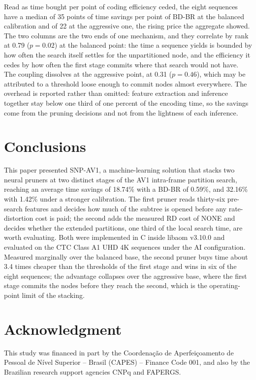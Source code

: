 \documentclass[conference]{IEEEtran}
\begin{document}
Read as time bought per point of coding efficiency ceded, the eight sequences
have a median of 35 points of time savings per point of BD-BR at the balanced
calibration and of 22 at the aggressive one, the rising price the aggregate
showed. The two columns are the two ends of one mechanism, and they correlate by
rank at 0.79 ($p = 0.02$) at the balanced point: the time a sequence yields is
bounded by how often the search itself settles for the unpartitioned node, and
the efficiency it cedes by how often the first stage commits where that search
would not have. The coupling dissolves at the aggressive point, at 0.31
($p = 0.46$), which may be attributed to a threshold loose enough to commit nodes
almost everywhere. The overhead is reported rather than omitted: feature
extraction and inference together stay below one third of one percent of the
encoding time, so the savings come from the pruning decisions and not from the
lightness of each inference.

\section{Conclusions}

This paper presented SNP-AV1, a machine-learning solution that stacks two neural
pruners at two distinct stages of the AV1 intra-frame partition search, reaching
an average time savings of 18.74\% with a BD-BR of 0.59\%, and 32.16\% with
1.42\% under a stronger calibration. The first pruner reads thirty-six pre-search
features and decides how much of the subtree is opened before any
rate-distortion cost is paid; the second adds the measured RD cost of NONE and
decides whether the extended partitions, one third of the local search time, are
worth evaluating. Both were implemented in C inside libaom v3.10.0 and evaluated
on the CTC Class A1 UHD 4K sequences under the AI configuration. Measured marginally
over the balanced base, the second pruner buys time about 3.4 times cheaper than
the thresholds of the first stage and wins in six of the eight sequences; the
advantage collapses over the aggressive base, where the first stage commits the
nodes before they reach the second, which is the operating-point limit of the
stacking.

\section*{Acknowledgment}

This study was financed in part by the Coordena\c{c}\~ao de Aperfei\c{c}oamento de
Pessoal de N\'ivel Superior -- Brasil (CAPES) -- Finance Code 001, and also by the
Brazilian research support agencies CNPq and FAPERGS.
\end{document}
